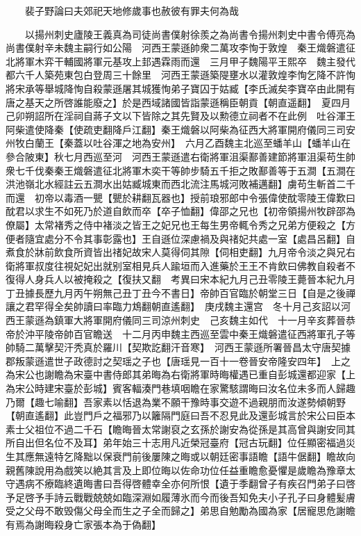 　　裴子野論曰夫郊祀天地修歲事也赦彼有罪夫何為哉

　　以揚州刺史廬陵王義真為司徒尚書僕射徐羨之為尚書令揚州刺史中書令傅亮為尚書僕射辛未魏主嗣行如公陽　河西王蒙遜帥衆二萬攻李恂于敦煌　秦王熾磐遣征北將軍木弈干輔國將軍元基攻上邽遇霖雨而還　三月甲子魏陽平王熙卒　魏主發代都六千人築苑東包白登周三十餘里　河西王蒙遜築隄壅水以灌敦煌李恂乞降不許恂將宋承等舉城降恂自殺蒙遜屠其城獲恂弟子寶囚于姑臧【李氏滅矣李寶卒由此開有唐之基天之所啓誰能廢之】於是西域諸國皆詣蒙遜稱臣朝貢【朝直遥翻】　夏四月己卯朔詔所在淫祠自蔣子文以下皆除之其先賢及以勲德立祠者不在此例　吐谷渾王阿柴遣使降秦【使疏吏翻降戶江翻】秦王熾磐以阿柴為征西大將軍開府儀同三司安州牧白蘭王【秦蓋以吐谷渾之地為安州】　六月乙酉魏主北巡至蟠羊山【蟠羊山在參合陂東】秋七月西巡至河　河西王蒙遜遣右衛將軍沮渠鄯善建節將軍沮渠苟生帥衆七千伐秦秦王熾磐遣征北將軍木奕干等帥步騎五千拒之敗鄯善等于五澗【五澗在洪池嶺北水經註云五澗水出姑臧城東而西北流注馬城河敗補邁翻】虜苟生斬首二千而還　初帝以毒酒一甖【甖於耕翻瓦器也】授前琅邪郎中令張偉使酖零陵王偉歎曰酖君以求生不如死乃於道自飲而卒【卒子恤翻】偉邵之兄也【初帝領揚州牧辟邵為僚屬】太常褚秀之侍中褚淡之皆王之妃兄也王每生男帝輒令秀之兄弟方便殺之【方便者隨宜處分不令其事彰露也】王自遜位深慮禍及與禇妃共處一室【處昌呂翻】自煮食於牀前飲食所資皆出禇妃故宋人莫得伺其隙【伺相吏翻】九月帝令淡之與兄右衛將軍叔度往視妃妃出就别室相見兵人踰垣而入進藥於王王不肯飲曰佛教自殺者不復得人身兵人以被掩殺之【復扶又翻　考異曰宋本紀九月己丑零陵王薨晉本紀九月丁丑據長歷九月丙午朔無己丑丁丑今不書日】帝帥百官臨於朝堂三日【自是之後禪讓之君罕得全矣帥讀曰率臨力鴆翻朝直遙翻】　庚戌魏主還宫　冬十月己亥詔以河西王蒙遜為鎮軍大將軍開府儀同三司涼州刺史　己亥魏主如代　十一月辛亥葬晉恭帝於沖平陵帝帥百官瞻送　十二月丙申魏主西巡至雲中秦王熾磐遣征西將軍孔子等帥騎二萬擊契汗秃真於羅川【契欺訖翻汗音寒】　河西王蒙遜所署晉昌太守唐契據郡叛蒙遜遣世子政德討之契瑶之子也【唐瑶見一百十一卷晉安帝隆安四年】　上之為宋公也謝瞻為宋臺中書侍郎其弟晦為右衛將軍時晦權遇已重自彭城還都迎家【上為宋公時建宋臺於彭城】賓客輻湊門巷填咽瞻在家驚駭謂晦曰汝名位未多而人歸趣乃爾【趣七喻翻】吾家素以恬退為業不願干豫時事交遊不過親朋而汝遂勢傾朝野【朝直遙翻】此豈門戶之福邪乃以籬隔門庭曰吾不忍見此及還彭城言於宋公曰臣本素士父祖位不過二千石【瞻晦晉太常謝裒之玄孫於謝安為從孫是其高曾與謝安同其所自出但名位不及耳】弟年始三十志用凡近榮冠臺府【冠古玩翻】位任顯密福過災生其應無遠特乞降黜以保衰門前後屢陳之晦或以朝廷密事語瞻【語牛倨翻】瞻故向親舊陳說用為戲笑以絶其言及上即位晦以佐命功位任益重瞻愈憂懼是歲瞻為豫章太守遇病不療臨終遺晦書曰吾得啓體幸全亦何所恨【遺于季翻曾子有疾召門弟子曰啓予足啓予手詩云戰戰兢兢如臨深淵如履薄氷而今而後吾知免夫小子孔子曰身體髪膚受之父母不敢毁傷父母全而生之子全而歸之】弟思自勉勵為國為家【居寵思危謝瞻有焉為謝晦殺身亡家張本為于偽翻】

